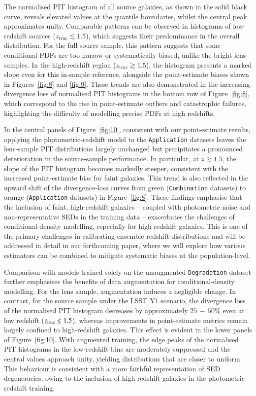 The normalised PIT histogram of all source galaxies, as shown in the solid black curve, reveals elevated values at the quantile boundaries, whilst the central peak approximates unity. Comparable patterns can be observed in histograms of low-redshift sources (\(z_\mathrm{true} \lesssim 1.5\)), which suggests their predominance in the overall distribution. For the full source sample, this pattern suggests that some conditional PDFs are too narrow or systematically biased, unlike the bright lens samples. In the high-redshift region (\(z_\mathrm{true} \gtrsim 1.5\)), the histogram presents a marked slope even for this in-sample reference, alongside the point-estimate biases shown in Figures~\ref{fig:8} and \ref{fig:9}. These trends are also demonstrated in the increasing divergence loss of normalised PIT histograms in the bottom row of Figure~\ref{fig:8}, which correspond to the rise in point-estimate outliers and catastrophic failures, highlighting the difficulty of modelling precise PDFs at high redshifts.

In the central panels of Figure~\ref{fig:10}, consistent with our point‐estimate results, applying the photometric‐redshift model to the \texttt{Application} datasets leaves the lens‐sample PIT distributions largely unchanged but precipitates a pronounced deterioration in the source‐sample performance. In particular, at \(z\gtrsim1.5\), the slope of the PIT histogram becomes markedly steeper, consistent with the increased point-estimate bias for faint galaxies. This trend is also reflected in the upward shift of the divergence‐loss curves from green (\texttt{Combination} datasets) to orange (\texttt{Application} datasets) in Figure~\ref{fig:8}. These findings emphasise that the inclusion of faint, high-redshift galaxies -- coupled with photometric noise and non-representative SEDs in the training data -- exacerbates the challenges of conditional-density modelling, especially for high redshift galaxies. This is one of the primary challenges in calibrating ensemble redshift distributions and will be addressed in detail in our forthcoming paper, where we will explore how various estimators can be combined to mitigate systematic biases at the population-level.

Comparison with models trained solely on the unaugmented \texttt{Degradation} dataset further emphasises the benefits of data augmentation for conditional‐density modelling. For the lens sample, augmentation induces a negligible change. In contrast, for the source sample under the LSST Y1 scenario, the divergence loss of the normalised PIT histogram decreases by approximately \(25 \,{-}\, 50\%\) even at low redshift (\(z_{\rm true} \lesssim 1.5\)), whereas improvements in point‐estimate metrics remain largely confined to high‐redshift galaxies. This effect is evident in the lower panels of Figure~\ref{fig:10}. With augmented training, the edge peaks of the normalised PIT histograms in the low‐redshift bins are moderately suppressed and the central values approach unity, yielding distributions that are closer to uniform. This behaviour is consistent with a more faithful representation of SED degeneracies, owing to the inclusion of high‐redshift galaxies in the photometric‐redshift training.

